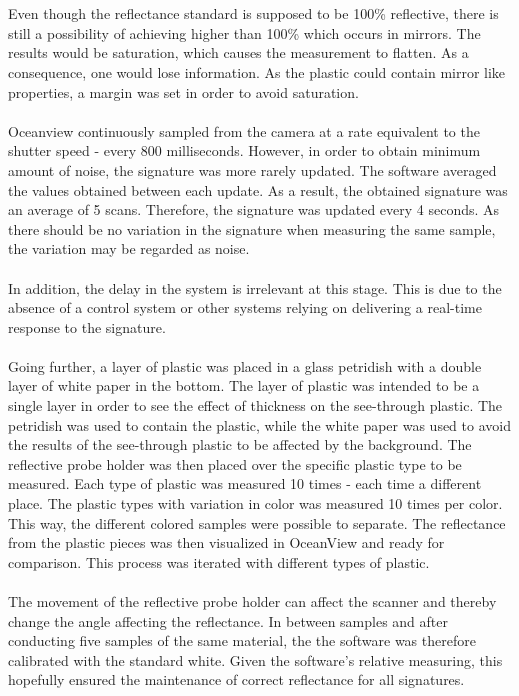 \\\\
Even though the reflectance standard is supposed to be 100\% reflective, there is still a possibility of achieving higher than 100\% which occurs in mirrors. The results would be saturation, which causes the measurement to flatten. As a consequence, one would lose information. As the plastic could contain mirror like properties, a margin was set in order to avoid saturation.
\\\\
Oceanview continuously sampled from the camera at a rate equivalent to the shutter speed - every 800 milliseconds. However, in order to obtain minimum amount of noise, the signature was more rarely updated. The software averaged the values obtained between each update. As a result, the obtained signature was an average of 5 scans. Therefore, the signature was updated every 4 seconds. As there should be no variation in the signature when measuring the same sample, the variation may be regarded as noise. 
\\\\
In addition, the delay in the system is irrelevant at this stage. This is due to the absence of a control system or other systems relying on delivering a real-time response to the signature.
\\\\
Going further, a layer of plastic was placed in a glass petridish with a double layer of white paper in the bottom. The layer of plastic was intended to be a single layer in order to see the effect of thickness on the see-through plastic. The petridish was used to contain the plastic, while the white paper was used to avoid the results of the see-through plastic to be affected by the background. The reflective probe holder was then placed over the specific plastic type to be measured. Each type of plastic was measured 10 times - each time a different place. The plastic types with variation in color was measured 10 times per color. This way, the different colored samples were possible to separate. The reflectance from the plastic pieces was then visualized in OceanView and ready for comparison. This process was iterated with different types of plastic. 
\\\\
The movement of the reflective probe holder can affect the scanner and thereby change the angle affecting the reflectance. In between samples and after conducting five samples of the same material, the the software was therefore calibrated with the standard white. Given the software’s relative measuring, this hopefully ensured the maintenance of correct reflectance for all signatures.
\\\\
